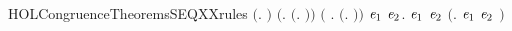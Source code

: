 \begin{SaveVerbatim}{HOLCongruenceTheoremsSEQXXrules}
\HOLTokenTurnstile{}  \ensuremath{(}\HOLTokenLambda{}. \ensuremath{)} \HOLSymConst{\HOLTokenConj{}} \ensuremath{(}\HOLSymConst{\HOLTokenForall{}}.  \ensuremath{(}\HOLTokenLambda{}. \ensuremath{)}\ensuremath{)} \HOLSymConst{\HOLTokenConj{}}
   \ensuremath{(}\HOLSymConst{\HOLTokenForall{}} .   \HOLSymConst{\HOLTokenImp{}}  \ensuremath{(}\HOLTokenLambda{}. \HOLSymConst{\ensuremath{\ldotp}} \ensuremath{)}\ensuremath{)} \HOLSymConst{\HOLTokenConj{}}
   \HOLSymConst{\HOLTokenForall{}}\ensuremath{\HOLBoundVar{e}\sb{\mathrm{1}}} \ensuremath{\HOLBoundVar{e}\sb{\mathrm{2}}}.  \ensuremath{\HOLBoundVar{e}\sb{\mathrm{1}}} \HOLSymConst{\HOLTokenConj{}}  \ensuremath{\HOLBoundVar{e}\sb{\mathrm{2}}} \HOLSymConst{\HOLTokenImp{}}  \ensuremath{(}\HOLTokenLambda{}. \ensuremath{\HOLBoundVar{e}\sb{\mathrm{1}}}  \HOLSymConst{\ensuremath{+}} \ensuremath{\HOLBoundVar{e}\sb{\mathrm{2}}} \ensuremath{)}
\end{SaveVerbatim}
\newcommand{\HOLCongruenceTheoremsSEQXXrules}{\UseVerbatim{HOLCongruenceTheoremsSEQXXrules}}
